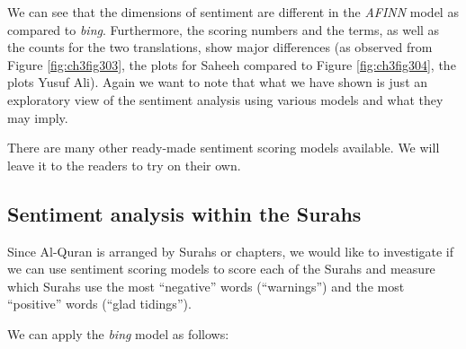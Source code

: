 \documentclass[
]{article}
\begin{document}
We can see that the dimensions of sentiment are different in the \emph{AFINN} model as compared to \emph{bing}. Furthermore, the scoring numbers and the terms, as well as the counts for the two translations, show major differences (as observed from Figure \ref{fig:ch3fig303}, the plots for Saheeh compared to Figure \ref{fig:ch3fig304}, the plots Yusuf Ali). Again we want to note that what we have shown is just an exploratory view of the sentiment analysis using various models and what they may imply.

There are many other ready-made sentiment scoring models available. We will leave it to the readers to try on their own.

\hypertarget{sentiment-analysis-within-the-surahs}{%
\subsection{Sentiment analysis within the Surahs}\label{sentiment-analysis-within-the-surahs}}

Since Al-Quran is arranged by Surahs or chapters, we would like to investigate if we can use sentiment scoring models to score each of the Surahs and measure which Surahs use the most ``negative'' words (``warnings'') and the most ``positive'' words (``glad tidings'').

We can apply the \emph{bing} model as follows:
\end{document}
